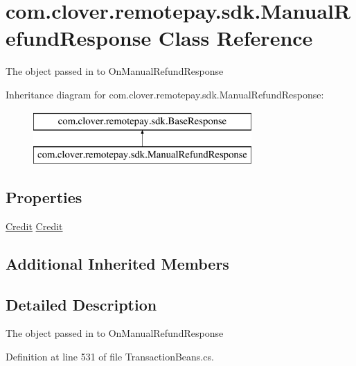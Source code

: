 \hypertarget{classcom_1_1clover_1_1remotepay_1_1sdk_1_1_manual_refund_response}{}\section{com.\+clover.\+remotepay.\+sdk.\+Manual\+Refund\+Response Class Reference}
\label{classcom_1_1clover_1_1remotepay_1_1sdk_1_1_manual_refund_response}


The object passed in to On\+Manual\+Refund\+Response  


Inheritance diagram for com.\+clover.\+remotepay.\+sdk.\+Manual\+Refund\+Response\+:\begin{figure}[H]
\begin{center}
\leavevmode
\includegraphics[height=2.000000cm]{classcom_1_1clover_1_1remotepay_1_1sdk_1_1_manual_refund_response}
\end{center}
\end{figure}
\subsection*{Properties}
\begin{DoxyCompactItemize}
\item 
\hyperlink{classcom_1_1clover_1_1sdk_1_1v3_1_1payments_1_1_credit}{Credit} \hyperlink{classcom_1_1clover_1_1remotepay_1_1sdk_1_1_manual_refund_response_a2ec27e6342c1beb413b171e22a2d8be0}{Credit}
\end{DoxyCompactItemize}
\subsection*{Additional Inherited Members}


\subsection{Detailed Description}
The object passed in to On\+Manual\+Refund\+Response 



Definition at line 531 of file Transaction\+Beans.\+cs.



